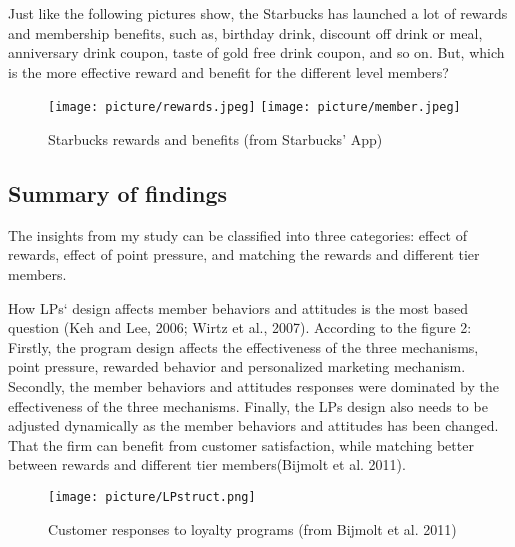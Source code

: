 \documentclass[12pt]{article}
\begin{document}
\begin{spacing}{1.5}
 Just like the following pictures show, the Starbucks has launched a lot of rewards and membership benefits, such as, birthday drink, discount off drink or meal, anniversary drink coupon, taste of gold free drink coupon, and so on. But, which is the more effective reward and benefit for the different level members?  
 

 \begin{figure}[ht]
\centering
\texttt{[image: picture/rewards.jpeg]}
\qquad
\texttt{[image: picture/member.jpeg]}
\caption{Starbucks rewards and benefits (from Starbucks' App)}
\label{fig:label}
\end{figure}

\subsection{Summary of findings}
The insights from my study can be classified into three categories: effect of rewards, effect of point pressure, and matching the rewards and different tier members.


How LPs‘ design affects member behaviors and attitudes is the most based question (Keh and Lee, 2006; Wirtz et al., 2007)\cite{keh2006reward}\cite{wirtz2007effective}. According to the figure 2: Firstly, the program design affects the effectiveness of the three mechanisms, point pressure, rewarded behavior and personalized marketing mechanism. Secondly, the member behaviors and attitudes responses were dominated by the effectiveness of the three mechanisms. Finally, the LPs design also needs to be adjusted dynamically as the member behaviors and attitudes has been changed. That the firm can benefit from customer satisfaction, while matching better between rewards and different tier members(Bijmolt et al. 2011)\cite{bijmolt2011loyalty}.  

\begin{figure}[ht]
\centering
\texttt{[image: picture/LPstruct.png]}
\caption{Customer responses to loyalty programs (from Bijmolt et al. 2011)}
\label{fig:label}
\end{figure}


\end{spacing}
\end{document}

